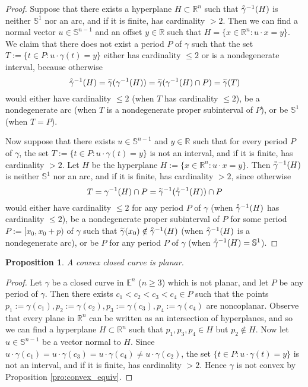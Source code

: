 \documentclass{amsart}
\newtheorem{proposition}{Proposition}[section]
\theoremstyle{definition}
\theoremstyle{remark}
\newcommand{\lring}[1]{\accentset{\circ}{#1}}
\newcommand{\ltilde}[1]{\accentset{\sim}{#1}}
\begin{document}
\begin{proof}
    Suppose that there exists a hyperplane $H\subset\mathbb{R}^n$
    such that $\lring{\gamma}^{-1}(H)$ is neither $\mathbb{S}^1$
    nor an arc, and if it is finite, has cardinality $>2$.
    Then we can find a normal vector $u\in\mathbb{S}^{n-1}$ and an
    offset $y\in\mathbb{R}$ such that
    $H=\{x\in\mathbb{R}^n:u\cdot x=y\}$.
    We claim that there does not exist a period $P$ of $\gamma$
    such that the set $T:=\{t\in P:u\cdot\gamma(t)=y\}$
    either has cardinality $\le2$ or is a nondegenerate interval,
    because otherwise
    \[\lring{\gamma}^{-1}(H)
        =\ltilde{\gamma}(\gamma^{-1}(H))
        =\ltilde{\gamma}(\gamma^{-1}(H)\cap P)
        =\ltilde{\gamma}(T)\]
    would either have cardinality $\le2$
    (when $T$ has cardinality $\le2$),
    be a nondegenerate arc (when $T$ is a nondegenerate
    proper subinterval of $P$),
    or be $\mathbb{S}^1$ (when $T=P$).

    Now suppose that there exists $u\in\mathbb{S}^{n-1}$ and
    $y\in\mathbb{R}$ such that for every period $P$ of $\gamma$,
    the set $T:=\{t\in P:u\cdot\gamma(t)=y\}$ is not an interval,
    and if it is finite, has cardinality $>2$.
    Let $H$ be the hyperplane $H:=\{x\in\mathbb{R}^n:u\cdot x=y\}$.
    Then $\lring{\gamma}^{-1}(H)$ is neither $\mathbb{S}^1$
    nor an arc, and if it is finite, has cardinality $>2$,
    since otherwise \[T=\gamma^{-1}(H)\cap P
        =\ltilde{\gamma}^{-1}(\lring{\gamma}^{-1}(H))\cap P\]
    would either have cardinality $\le2$ for any period $P$ of
    $\gamma$ (when $\lring{\gamma}^{-1}(H)$ has cardinality $\le2$),
    be a nondegenerate proper subinterval of $P$ for some period
    $P:=[x_0,x_0+p)$ of $\gamma$ such that
    $\ltilde{\gamma}(x_0)\notin\lring{\gamma}^{-1}(H)$
    (when $\lring{\gamma}^{-1}(H)$ is a nondegenerate arc),
    or be $P$ for any period $P$ of $\gamma$
    (when $\lring{\gamma}^{-1}(H)=\mathbb{S}^1$).
\end{proof}

\begin{proposition}
    \label{pro:convex_planar}
    A convex closed curve is planar.
\end{proposition}

\begin{proof}
    Let $\gamma$ be a closed curve in $\mathbb{E}^n$ ($n\ge 3$) which
    is not planar, and let $P$ be any period of $\gamma$.
    Then there exists $c_1<c_2<c_3<c_4\in P$ such that the points
    $p_1:=\gamma(c_1),p_2:=\gamma(c_2),
        p_3:=\gamma(c_3),p_4:=\gamma(c_4)$
    are noncoplanar. Observe that every plane in $\mathbb{R}^n$
    can be written as an intersection of hyperplanes, and so
    we can find a hyperplane $H\subset\mathbb{R}^n$
    such that $p_1,p_3,p_4\in H$ but $p_2\notin H$. Now let
    $u\in\mathbb{S}^{n-1}$ be a vector normal to $H$. Since
    $u\cdot\gamma(c_1)=u\cdot\gamma(c_3)=u\cdot\gamma(c_4)
        \ne u\cdot\gamma(c_2)$,
    the set $\{t\in P:u\cdot\gamma(t)=y\}$ is not an interval,
    and if it is finite, has cardinality $>2$. Hence $\gamma$
    is not convex by Proposition \ref{pro:convex_equiv}.
\end{proof}
\end{document}
